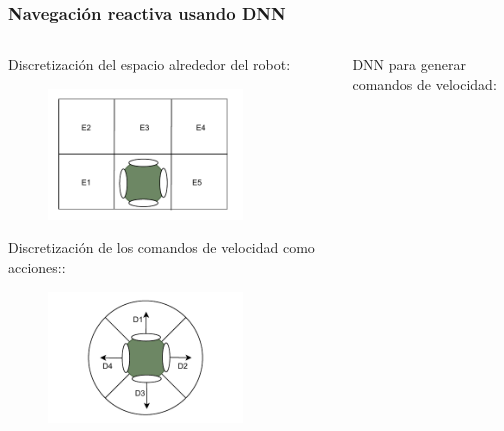 \begin{frame}\frametitle{Navegación reactiva usando DNN}
  \begin{columns}
    \begin{column}{0.25\textwidth}
      Discretización del espacio alrededor del robot:
      \begin{figure}
        \centering
        \includegraphics[width=0.8\textwidth]{Figures/MotionPlanning/RLStates.pdf}
      \end{figure}
      Discretización de los comandos de velocidad como acciones::
      \begin{figure}
        \centering
        \includegraphics[width=0.8\textwidth]{Figures/MotionPlanning/RLActions.pdf}
      \end{figure}
    \end{column}
    \begin{column}{0.4\textwidth}
      DNN para generar comandos de velocidad:
      \begin{figure}
        \centering

\end{figure}
\end{column}
\end{columns}
\end{frame}
